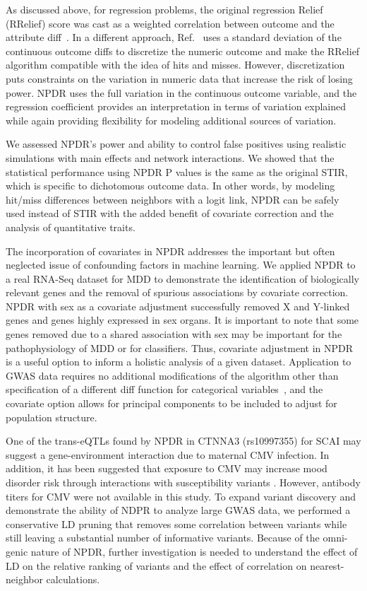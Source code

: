 \documentclass[10pt]{article}
\begin{document}
As discussed above, for regression problems, the original regression Relief (RRelief) score was cast as a weighted correlation between outcome and the attribute diff~\cite{robnik03}.
In a different approach, Ref.~\cite{urbanowicz17} uses a standard deviation of the continuous outcome diffs to discretize the numeric outcome and make the RRelief algorithm compatible with the idea of hits and misses.
However, discretization puts constraints on the variation in numeric data that increase the risk of losing power.
NPDR uses the full variation in the continuous outcome variable, and the regression coefficient provides an interpretation in terms of variation explained while again providing flexibility for modeling additional sources of variation. 

We assessed NPDR's power and ability to control false positives using realistic simulations with main effects and network interactions.
We showed that the statistical performance using NPDR P values is the same as the original STIR, which is specific to dichotomous outcome data.
In other words, by modeling hit/miss differences between neighbors with a logit link, NPDR can be safely used instead of STIR with the added benefit of covariate correction and the analysis of quantitative traits.  

The incorporation of covariates in NPDR addresses the important but often neglected issue of confounding factors in machine learning. We applied NPDR to a real RNA-Seq dataset for MDD to demonstrate the identification of biologically relevant genes and the removal of spurious associations by covariate correction. NPDR with sex as a covariate adjustment successfully removed X and Y-linked genes and genes highly expressed in sex organs. It is important to note that some genes removed due to a shared association with sex may be important for the pathophysiology of MDD or for classifiers.  Thus, covariate adjustment in NPDR is a useful option to inform a holistic analysis of a given dataset. Application to GWAS data requires no additional modifications of the algorithm other than specification of a different diff function for categorical variables~\cite{titv}, and the covariate option allows for principal components to be included to adjust for population structure. 

One of the trans-eQTLs found by NPDR in CTNNA3 (rs10997355) for SCAI may suggest a gene-environment interaction due to maternal CMV infection. In addition, it has been suggested that exposure to CMV may increase mood disorder risk through interactions with susceptibility variants \cite{kim2007exposure}. However, antibody titers for CMV were not available in this study. To expand variant discovery and demonstrate the ability of NDPR to analyze large GWAS data, we performed a conservative LD pruning that removes some correlation between variants while still leaving a substantial number of informative variants. Because of the omni-genic nature of NPDR, further investigation is needed to understand the effect of LD on the relative ranking of variants and the effect of correlation on nearest-neighbor calculations. 
\end{document}
